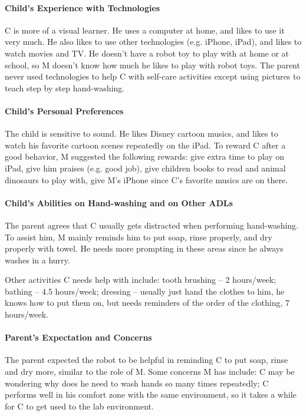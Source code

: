 \paragraph{Child's Experience with Technologies}
C is more of a visual learner.  He uses a computer at home, and likes to use it very much.  He also likes to use other technologies (e.g. iPhone, iPad), and likes to watch movies and TV.  He doesn't have a robot toy to play with at home or at school, so M doesn't know how much he likes to play with robot toys.  The parent never used technologies to help C with self-care activities except using pictures to teach step by step hand-washing.

\paragraph{Child's Personal Preferences}
The child is sensitive to sound.  He likes Disney cartoon musics, and likes to watch his favorite cartoon scenes repeatedly on the iPad.  To reward C after a good behavior, M suggested the following rewards: give extra time to play on iPad, give him praises (e.g. good job), give children books to read and animal dinosaurs to play with, give M's iPhone since C's favorite musics are on there.

\paragraph{Child's Abilities on Hand-washing and on Other ADLs}
The parent agrees that C usually gets distracted when performing hand-washing.  To assist him, M mainly reminds him to put soap, rinse properly, and dry properly with towel.  He needs more prompting in these areas since he always washes in a hurry.

Other activities C needs help with include:  tooth brushing -- 2 hours/week; bathing -- 4.5 hours/week; dressing -- usually just hand the clothes to him, he knows how to put them on, but needs reminders of the order of the clothing, 7 hours/week.

\paragraph{Parent's Expectation and Concerns}
The parent expected the robot to be helpful in reminding C to put soap, rinse and dry more, similar to the role of M.  Some concerns M has include: C may be wondering why does he need to wash hands so many times repeatedly; C performs well in his comfort zone with the same environment, so it takes a while for C to get used to the lab environment.

